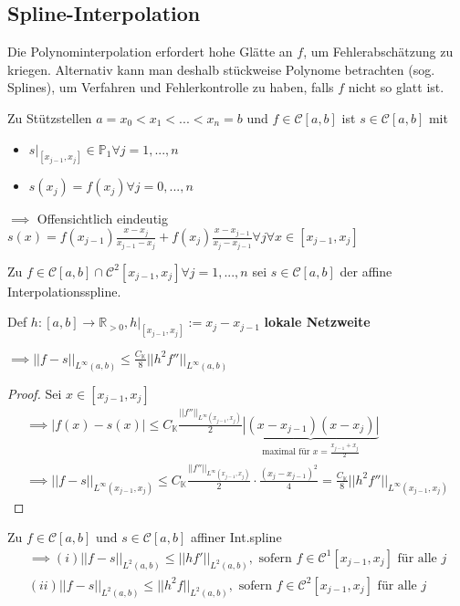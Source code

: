 \subsection{Spline-Interpolation}

Die Polynominterpolation erfordert hohe Glätte an $f$, um Fehlerabschätzung zu kriegen. Alternativ kann man deshalb stückweise Polynome betrachten (sog. Splines), um Verfahren und Fehlerkontrolle zu haben, falls $f$ nicht so glatt ist.

\begin{example}
	Zu Stützstellen $a = x_0 < x_1 < ... < x_n = b$ und $f \in \mathcal{C}[a,b]$ ist $s \in \mathcal{C}[a,b]$ mit
	\begin{itemize}
		\item $s|_{[x_{j-1}, x_j]} \in \mathbb{P}_1 \forall j=1, ..., n$
		\item $s(x_j) = f(x_j) \forall j=0, ..., n$
	\end{itemize}
	
	$\implies$ Offensichtlich eindeutig $s(x) = f(x_{j-1}) \frac{x-x_j}{x_{j-1}-x_j} + f(x_j) \frac{x-x_{j-1}}{x_j-x_{j-1}} \forall j \forall x \in [x_{j-1}, x_j]$
\end{example}

\begin{lemma}
	Zu $f \in \mathcal{C}[a, b] \cap \mathcal{C}^2[x_{j-1}, x_j] \forall j=1, ..., n$ sei $s \in \mathcal{C}[a, b]$ der affine Interpolationsspline.
	
	Def $h:[a,b] \rightarrow \mathbb{R}_{>0}, h|_{[x_{j-1}, x_j]} := x_j - x_{j-1}$ \textbf{lokale Netzweite}
	
	$\implies ||f-s||_{L^\infty(a,b)} \leq \frac{C_{\mathbb{K}}}{8} ||h^2 f''||_{L^\infty(a,b)}$
\end{lemma}

\begin{proof}
	Sei $x \in [x_{j-1}, x_j]$
	\begin{align*}
		\implies |f(x) - s(x)| \leq C_{\mathbb{K}} \frac{||f''||_{L^\infty(x_{j-1}, x_j)}}{2} \underbrace{|(x-x_{j-1})(x-x_j)|}_{\text{maximal für }x = \frac{x_{j-1} + x_j}{2}}\\
		\implies ||f-s||_{L^\infty(x_{j-1}, x_j)} \leq C_{\mathbb{K}} \frac{||f''||_{L^\infty(x_{j-1}, x_j)}}{2} \cdot \frac{(x_j - x_{j-1})^2}{4} = \frac{C_{\mathbb{K}}}{8} ||h^2 f''||_{L^\infty(x_{j-1}, x_j)}
	\end{align*}
\end{proof}

\begin{lemma}
	Zu $f \in \mathcal{C}[a, b]$ und $s \in \mathcal{C}[a, b]$ affiner Int.spline
	\begin{align*}
		\implies (i) ||f-s||_{L^2(a,b)} \leq ||h f'||_{L^2(a,b)}, \text{ sofern } f \in \mathcal{C}^1[x_{j-1}, x_j] \text{ für alle } j\\
		(ii) ||f-s||_{L^2(a,b)} \leq ||h^2f||_{L^2(a,b)}, \text{ sofern } f \in \mathcal{C}^2[x_{j-1}, x_j] \text{ für alle } j
	\end{align*}
\end{lemma}

